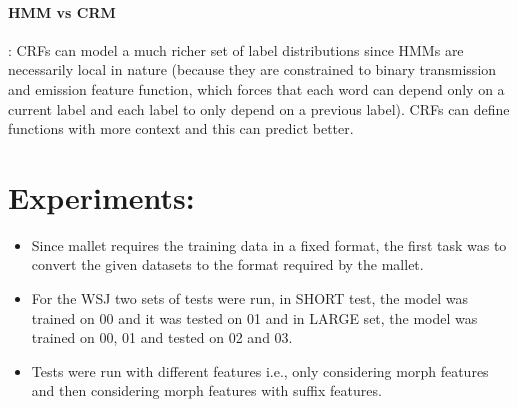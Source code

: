 \documentclass[10pt] {article}
\begin{document}
\paragraph{HMM vs CRM}: CRFs can model a much richer set of label distributions since HMMs are necessarily local in nature (because they are constrained to binary transmission and emission feature function, which forces that each word can depend only on a current label and each label to only depend on a previous label). CRFs can define functions with more context and this can predict better.

\section{Experiments:}
\begin{itemize}
\item Since mallet requires the training data in a fixed format, the first task was to convert the given datasets to the format required by the mallet.
\item For the WSJ two sets of tests were run, in SHORT test, the model was trained on 00 and it was tested on 01 and in LARGE set, the model was trained on 00, 01 and tested on 02 and 03.
\item Tests were run with different features i.e., only considering morph features and then considering morph features with suffix features.
\end{itemize}
\end{document}
